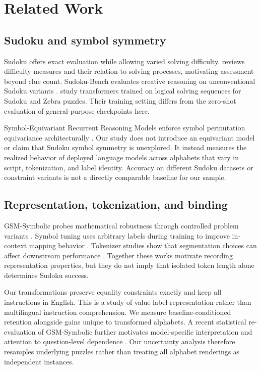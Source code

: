 \documentclass[11pt]{article}
\begin{document}
\section{Related Work}
\subsection{Sudoku and symbol symmetry}
Sudoku offers exact evaluation while allowing varied solving difficulty. \citet{pelanek2014sudoku} reviews difficulty measures and their relation to solving processes, motivating assessment beyond clue count. Sudoku-Bench evaluates creative reasoning on unconventional Sudoku variants \citep{seely2025sudokubench}. \citet{shah2024causal} study transformers trained on logical solving sequences for Sudoku and Zebra puzzles. Their training setting differs from the zero-shot evaluation of general-purpose checkpoints here.

Symbol-Equivariant Recurrent Reasoning Models enforce symbol permutation equivariance architecturally \citep{freinschlag2026equivariant}. Our study does not introduce an equivariant model or claim that Sudoku symbol symmetry is unexplored. It instead measures the realized behavior of deployed language models across alphabets that vary in script, tokenization, and label identity. Accuracy on different Sudoku datasets or constraint variants is not a directly comparable baseline for our sample.

\subsection{Representation, tokenization, and binding}
GSM-Symbolic probes mathematical robustness through controlled problem variants \citep{mirzadeh2025gsmsymbolic}. Symbol tuning uses arbitrary labels during training to improve in-context mapping behavior \citep{wei2023symbol}. Tokenizer studies show that segmentation choices can affect downstream performance \citep{rust2021tokenizer}. Together these works motivate recording representation properties, but they do not imply that isolated token length alone determines Sudoku success.

Our transformations preserve equality constraints exactly and keep all instructions in English. This is a study of value-label representation rather than multilingual instruction comprehension. We measure baseline-conditioned retention alongside gains unique to transformed alphabets. A recent statistical re-evaluation of GSM-Symbolic further motivates model-specific interpretation and attention to question-level dependence \citep{dlugosz2026earnest}. Our uncertainty analysis therefore resamples underlying puzzles rather than treating all alphabet renderings as independent instances.
\end{document}
